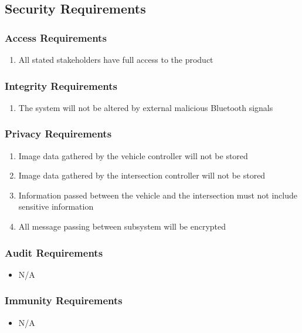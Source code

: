 \documentclass [11pt]{article}
\begin{document}
\subsection{Security Requirements }
\subsubsection{Access Requirements }
	\begin{enumerate}[label=\textbf{\Alph*}:]
		\item All stated stakeholders have full access to the product
	\end{enumerate}

\subsubsection{Integrity Requirements }
	\begin{enumerate}[label=\textbf{\Alph*}:]
		\item The system will not be altered by external malicious Bluetooth signals
	\end{enumerate}

\subsubsection{Privacy Requirements }
	\begin{enumerate}[label=\textbf{\Alph*}:]
		\item Image data gathered by the vehicle controller will not be stored 
		\item Image data gathered by the intersection controller will not be stored
		\item Information passed between the vehicle and the intersection must not include sensitive information
		\item All message passing between subsystem will be encrypted
	\end{enumerate}

\subsubsection{Audit  Requirements }
	\begin{itemize}
		\item N/A
	\end{itemize} 

\subsubsection{Immunity Requirements  }
	\begin{itemize}
		\item N/A
	\end{itemize}
\end{document}
